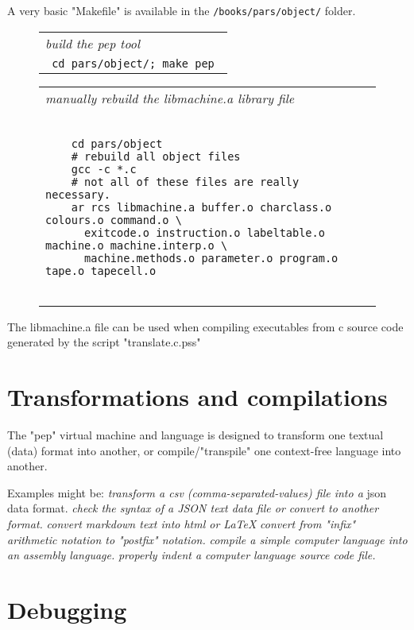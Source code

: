 \documentclass[a4paper,12pt]{article}
\begin{document}
  A very basic "Makefile" is available in the \texttt{/books/pars/object/}
  folder.
 \begin{figure}
 \begin{tabular}{ l }
 \emph{ build the pep tool } \\ 
 \verb| cd pars/object/; make pep |
 \end{tabular} 
 \end{figure}
 \begin{figure}
 \begin{tabular}{ l }
 \emph{ manually rebuild the libmachine.a library file  } \\ 
 \begin{lstlisting}[breaklines] 

    cd pars/object
    # rebuild all object files
    gcc -c *.c
    # not all of these files are really necessary. 
    ar rcs libmachine.a buffer.o charclass.o colours.o command.o \
      exitcode.o instruction.o labeltable.o machine.o machine.interp.o \
      machine.methods.o parameter.o program.o tape.o tapecell.o
  
 \end{lstlisting} 
 \end{tabular} 

 \end{figure}
  
  The libmachine.a file can be used when compiling executables from
  c source code generated by the script "translate.c.pss"

\section{Transformations and compilations}

  The "pep" virtual machine and language is designed to
  transform one textual (data) format into another, or compile/"transpile"
  one context-free language into another.

  Examples might be:
 \emph{ transform a csv (comma-separated-values) file into a  }
      json data format.
 \emph{ check the syntax of a JSON text data file or convert to another format. }
 \emph{ convert markdown text into html or LaTeX }
 \emph{ convert from "infix" arithmetic notation to "postfix" notation. }
 \emph{ compile a simple computer language into an assembly language. }
 \emph{ properly indent a computer language source code file. }
 
\section{Debugging}
\end{document}
